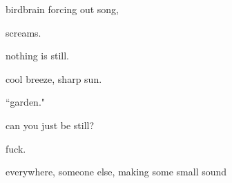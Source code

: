 \documentclass[extrafontsizes, 48pt]{memoir}
\newcommand\blankpage{%
    \null
    \thispagestyle{empty}%
    \addtocounter{page}{-1}%
    \newpage}
\begin{document}
	\begin{minipage}{.6\textwidth}
	birdbrain forcing out song,
	\end{minipage}
	\newpage

	\begin{minipage}{.6\textwidth}
	screams.
	\afterpage{\blankpage}
	\end{minipage}
	\newpage

	\begin{minipage}{.6\textwidth}
	nothing is still.
	\end{minipage}
	\newpage

	\begin{minipage}{.6\textwidth}
	cool breeze, sharp sun.
	\end{minipage}
	\newpage

	\begin{minipage}{.6\textwidth}
	``garden."
	\end{minipage}
	\newpage

	\begin{minipage}{.6\textwidth}
	can you just be still?
	\end{minipage}
	\newpage

	\begin{minipage}{.6\textwidth}
	fuck.
	\afterpage{\blankpage}
	\end{minipage}
	\newpage

	\begin{minipage}{.6\textwidth}
	everywhere, someone else, making some small sound
	\end{minipage}
	\newpage
\end{document}

